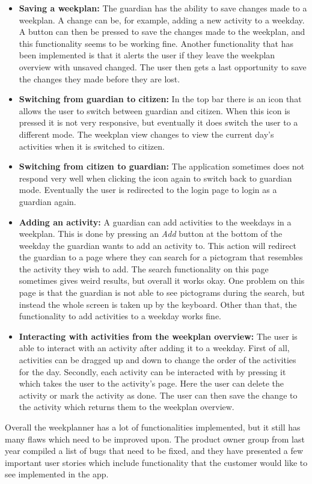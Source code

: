 \begin{itemize}
    \\
    \item \textbf{Saving a weekplan:} The guardian has the ability to save changes made to a weekplan.
    A change can be, for example, adding a new activity to a weekday.
    A button can then be pressed to save the changes made to the weekplan, and this functionality seems to be working fine.
    Another functionality that has been implemented is that it alerts the user if they leave the weekplan overview with unsaved changed.
    The user then gets a last opportunity to save the changes they made before they are lost.
    \\
    \item \textbf{Switching from guardian to citizen:} In the top bar there is an icon that allows the user to switch between guardian and citizen.
    When this icon is pressed it is not very responsive, but eventually it does switch the user to a different mode.
    The weekplan view changes to view the current day's activities when it is switched to citizen.
    \\
    \item \textbf{Switching from citizen to guardian:} The application sometimes does not respond very well when clicking the icon again to switch back to guardian mode.
    Eventually the user is redirected to the login page to login as a guardian again.
    \\
    \item \textbf{Adding an activity:} A guardian can add activities to the weekdays in a weekplan.
    This is done by pressing an \textit{Add} button at the bottom of the weekday the guardian wants to add an activity to.
    This action will redirect the guardian to a page where they can search for a pictogram that resembles the activity they wish to add.
    The search functionality on this page sometimes gives weird results, but overall it works okay.
    One problem on this page is that the guardian is not able to see pictograms during the search, but instead the whole screen is taken up by the keyboard.
    Other than that, the functionality to add activities to a weekday works fine.
    \\
    \item \textbf{Interacting with activities from the weekplan overview:}  The user is able to interact with an activity after adding it to a weekday.
    First of all, activities can be dragged up and down to change the order of the activities for the day.
    Secondly, each activity can be interacted with by pressing it which takes the user to the activity's page.
    Here the user can delete the activity or mark the activity as done.
    The user can then save the change to the activity which returns them to the weekplan overview.
    \\
\end{itemize}
Overall the weekplanner has a lot of functionalities implemented, but it still has many flaws which need to be improved upon.
The product owner group from last year compiled a list of bugs that need to be fixed, and they have presented a few important user stories which include functionality that the customer would like to see implemented in the app.